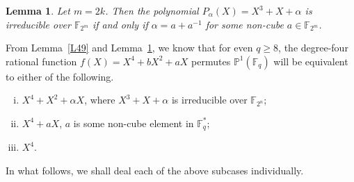 \documentclass[12pt]{amsart}
\newtheorem{lem}[thm]{Lemma}
\numberwithin{equation}{section}
\theoremstyle{definition}
\newcommand{\F}{\mathbb F}
\newcommand{\bP}{\mathbb P}
\begin{document}
\begin{lem}\cite{Bracken_14} \label{L50}
Let $m=2k$. Then the polynomial $P_\alpha(X)=X^3+X+ \alpha$ is irreducible over $\F_{2^m}$ if and only if $\alpha=a+a^{-1}$ for some non-cube $a \in \F_{2^m}$.
\end{lem}
From Lemma~\ref{L49} and Lemma~\ref{L50}, we know that for even $q \geq 8$, the degree-four rational function $f(X)=X^4 + bX^2 + aX$ permutes $\bP^1(\F_{q})$ will be equivalent to either of the following.
\begin{enumerate}[(i)]
 \item $X^4+X^2+\alpha X$, where $X^3+X+\alpha$ is irreducible over $\F_{2^n}$;
 \item $X^4+aX$, $a$ is some non-cube element in $ \F_{q}^*$;
 \item $X^4$.
\end{enumerate}
In what follows, we shall deal each of the above subcases individually.
\end{document}
